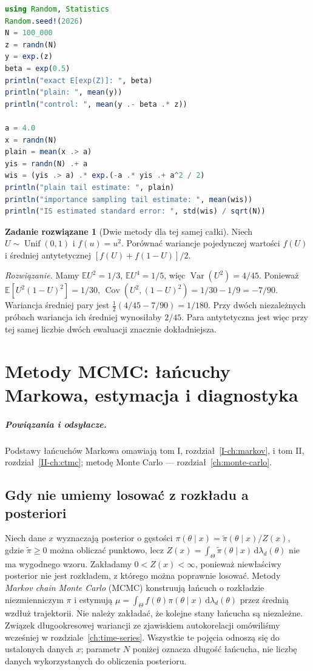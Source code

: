 \documentclass[11pt,a4paper,oneside]{report}
\numberwithin{equation}{chapter}
\theoremstyle{plain}
\theoremstyle{definition}
\newtheorem{zadanie}{Zadanie rozwiązane}[chapter]
\theoremstyle{remark}
\newcommand{\E}{\mathbb E}
\newcommand{\Var}{\operatorname{Var}}
\newcommand{\Cov}{\operatorname{Cov}}
\newcommand{\dd}{\mathrm d}
\begin{document}
\begin{lstlisting}[language=Julia,caption={Kompletny program: redukcja wariancji przez zmienną kontrolną i estymacja rzadkiego ogona (Julia, Random i Statistics).}]
using Random, Statistics
Random.seed!(2026)
N = 100_000
z = randn(N)
y = exp.(z)
beta = exp(0.5)
println("exact E[exp(Z)]: ", beta)
println("plain: ", mean(y))
println("control: ", mean(y .- beta .* z))

a = 4.0
x = randn(N)
plain = mean(x .> a)
yis = randn(N) .+ a
wis = (yis .> a) .* exp.(-a .* yis .+ a^2 / 2)
println("plain tail estimate: ", plain)
println("importance sampling tail estimate: ", mean(wis))
println("IS estimated standard error: ", std(wis) / sqrt(N))
\end{lstlisting}

\begin{zadanie}[Dwie metody dla tej samej całki]
Niech $U\sim\operatorname{Unif}(0,1)$ i $f(u)=u^2$.
Porównać wariancje pojedynczej wartości $f(U)$ i
średniej antytetycznej $[f(U)+f(1-U)]/2$.
\par\emph{Rozwiązanie.} Mamy $\E U^2=1/3$,
$\E U^4=1/5$, więc $\Var(U^2)=4/45$.
Ponieważ $\E[U^2(1-U)^2]=1/30$,
$\Cov(U^2,(1-U)^2)=1/30-1/9=-7/90$.
Wariancja średniej pary jest
$\tfrac12(4/45-7/90)=1/180$.
Przy dwóch niezależnych próbach wariancja ich średniej
wynosiłaby $2/45$. Para antytetyczna jest więc przy
tej samej liczbie dwóch ewaluacji znacznie dokładniejsza.
\end{zadanie}


\chapter{Metody MCMC: łańcuchy Markowa, estymacja i diagnostyka}
\label{ch:mcmc}
\paragraph{Powiązania i odsyłacze.} Podstawy łańcuchów Markowa omawiają tom I, rozdział~\ref{I-ch:markov}, i tom II, rozdział~\ref{II-ch:ctmc}; metodę Monte Carlo — rozdział~\ref{ch:monte-carlo}.


\section{Gdy nie umiemy losować z rozkładu a posteriori}
Niech dane $x$ wyznaczają posterior o gęstości
$\pi(\theta\mid x)=\widetilde\pi(\theta\mid x)/Z(x)$,
gdzie $\widetilde\pi\ge0$ można obliczać punktowo, lecz
$Z(x)=\int_\Theta\widetilde\pi(\theta\mid x)\,
\dd\lambda_d(\theta)$ nie ma wygodnego wzoru.
Zakładamy $0<Z(x)<\infty$, ponieważ niewłaściwy posterior
nie jest rozkładem, z którego można poprawnie losować.
Metody \emph{Markov chain Monte Carlo} (MCMC) konstruują
łańcuch o rozkładzie niezmienniczym $\pi$ i estymują
$\mu=\int_\Theta f(\theta)\pi(\theta\mid x)\,
\dd\lambda_d(\theta)$ przez średnią wzdłuż trajektorii.
Nie należy zakładać, że kolejne stany łańcucha są niezależne.
Związek długookresowej wariancji ze zjawiskiem autokorelacji omówiliśmy wcześniej w rozdziale~\ref{ch:time-series}.
Wszystkie te pojęcia odnoszą się do ustalonych danych $x$;
parametr $N$ poniżej oznacza długość łańcucha, nie liczbę
danych wykorzystanych do obliczenia posterioru.
\end{document}
